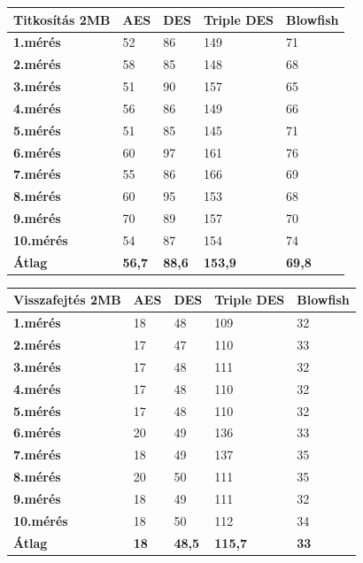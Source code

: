 \newpage
\begin{center}
	\begin{tabular}{|p{2.4cm}|p{2cm}|p{2cm}|p{2cm}|p{2cm}|}
		\hline
		\textbf{Titkosítás} \newline \textbf{2MB} & \textbf{AES} & \textbf{DES} & \textbf{Triple DES} & \textbf{Blowfish}\\
		\hline
		\textbf{1.mérés} & 52 & 86 & 149 & 71\\
		\hline
		\textbf{2.mérés} & 58 & 85 & 148 & 68\\
		\hline
		\textbf{3.mérés} & 51 & 90 & 157 & 65\\
		\hline
		\textbf{4.mérés} & 56 & 86 & 149 & 66\\
		\hline
		\textbf{5.mérés} & 51 & 85 & 145 & 71\\
		\hline
		\textbf{6.mérés} & 60 & 97 & 161 & 76\\
		\hline
		\textbf{7.mérés} & 55 & 86 & 166 & 69\\
		\hline
		\textbf{8.mérés} & 60 & 95 & 153 & 68\\
		\hline
		\textbf{9.mérés} & 70 & 89 & 157 & 70\\
		\hline
		\textbf{10.mérés} & 54 & 87 & 154 & 74\\
		\hline
		\hline
		\textbf{Átlag} & \textbf{56,7} & \textbf{88,6} & \textbf{153,9} & \textbf{69,8} \\
		\hline
	\end{tabular}
\end{center}

\begin{center}
	\begin{tabular}{|p{2.4cm}|p{2cm}|p{2cm}|p{2cm}|p{2cm}|}
		\hline
		\textbf{Visszafejtés} \newline \textbf{2MB} & \textbf{AES} & \textbf{DES} & \textbf{Triple DES} & \textbf{Blowfish}\\
		\hline
		\textbf{1.mérés} & 18 & 48 & 109 & 32\\
		\hline
		\textbf{2.mérés} & 17 & 47 & 110 & 33\\
		\hline
		\textbf{3.mérés} & 17 & 48 & 111 & 32\\
		\hline
		\textbf{4.mérés} & 17 & 48 & 110 & 32\\
		\hline
		\textbf{5.mérés} & 17 & 48 & 110 & 32\\
		\hline
		\textbf{6.mérés} & 20 & 49 & 136 & 33\\
		\hline
		\textbf{7.mérés} & 18 & 49 & 137 & 35\\
		\hline
		\textbf{8.mérés} & 20 & 50 & 111 & 35\\
		\hline
		\textbf{9.mérés} & 18 & 49 & 111 & 32\\
		\hline
		\textbf{10.mérés} & 18 & 50 & 112 & 34\\
		\hline
		\hline
		\textbf{Átlag} & \textbf{18} & \textbf{48,5} & \textbf{115,7} & \textbf{33}\\
		\hline
	\end{tabular}
\end{center}

